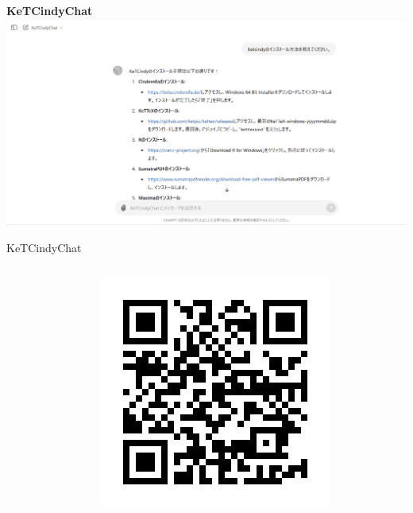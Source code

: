 \documentclass[dvipdfmx, unicode]{beamer}
\begin{document}

\begin{frame}{\bfseries KeTCindyChat}
  \includegraphics[width=\linewidth]{img/KeTCindyChat/appsampleGPT.png}
\end{frame}

\begin{frame}{KeTCindyChat}
  \begin{columns}[T]
    \begin{column}{0.5\linewidth}
    \end{column}
    \begin{column}{0.5\linewidth}
      \includegraphics[width=\linewidth]{img/KeTCindyChat/KeTCindyChatGPT.png}
    \end{column}
  \end{columns}
\end{frame}
\end{document}
